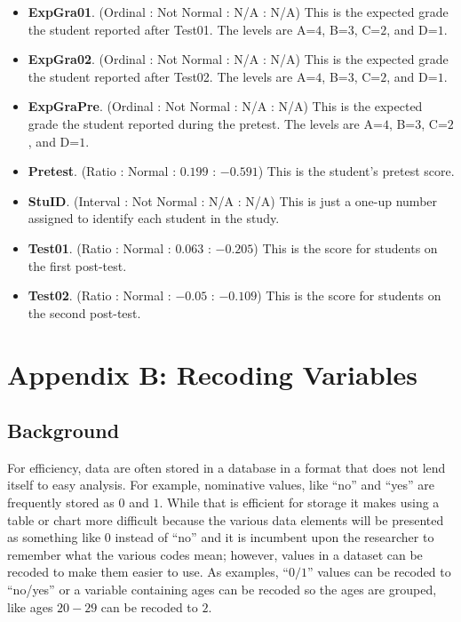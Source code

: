 \begin{itemize}
  \item \textbf{ExpGra01}. (Ordinal : Not Normal : N/A : N/A) This is the expected grade the student reported after Test01. The levels are A=$ 4 $, B=$ 3 $, C=$ 2 $, and D=$ 1 $.
  \item \textbf{ExpGra02}. (Ordinal : Not Normal : N/A : N/A) This is the expected grade the student reported after Test02. The levels are A=$ 4 $, B=$ 3 $, C=$ 2 $, and D=$ 1 $.
  \item \textbf{ExpGraPre}. (Ordinal : Not Normal : N/A : N/A) This is the expected grade the student reported during the pretest. The levels are A=$ 4 $, B=$ 3 $, C=$ 2 $, and D=$ 1 $.
  \item \textbf{Pretest}. (Ratio : Normal : $ 0.199 $ : $ -0.591 $) This is the student's pretest score.
  \item \textbf{StuID}. (Interval : Not Normal : N/A : N/A) This is just a one-up number assigned to identify each student in the study.
  \item \textbf{Test01}. (Ratio : Normal : $ 0.063 $ : $ -0.205 $) This is the score for students on the first post-test.
  \item \textbf{Test02}. (Ratio : Normal : $ -0.05 $ : $ -0.109 $) This is the score for students on the second post-test.
\end{itemize}

\section{Appendix B: Recoding Variables} \label{app:b}

\subsection{Background}

For efficiency, data are often stored in a database in a format that does not lend itself to easy analysis. For example, nominative values, like ``no'' and ``yes'' are frequently stored as $ 0 $ and $ 1 $. While that is efficient for storage it makes using a table or chart more difficult because the various data elements will be presented as something like $ 0 $ instead of ``no'' and it is incumbent upon the researcher to remember what the various codes mean; however, values in a dataset can be recoded to make them easier to use. As examples, ``$ 0 / 1 $'' values can be recoded to ``no/yes'' or a variable containing ages can be recoded so the ages are grouped, like ages $ 20 - 29 $ can be recoded to $ 2 $. 

